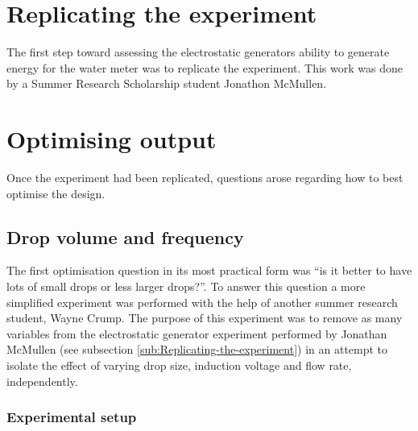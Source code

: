 \section{Replicating the experiment\label{sub:Replicating-the-experiment}}

The first step toward assessing the electrostatic generators ability
to generate energy for the water meter was to replicate the experiment.
This work was done by a Summer Research Scholarship student Jonathon
McMullen.


\section{Optimising output}

Once the experiment had been replicated, questions arose regarding
how to best optimise the design.


\subsection*{Drop volume and frequency}

The first optimisation question in its most practical form was ``is
it better to have lots of small drops or less larger drops?''. To
answer this question a more simplified experiment was performed with
the help of another summer research student, Wayne Crump. The purpose
of this experiment was to remove as many variables from the electrostatic
generator experiment performed by Jonathan McMullen (see subsection
\ref{sub:Replicating-the-experiment}) in an attempt to isolate the
effect of varying drop size, induction voltage and flow rate, independently.


 \subsubsection*{Experimental setup}

